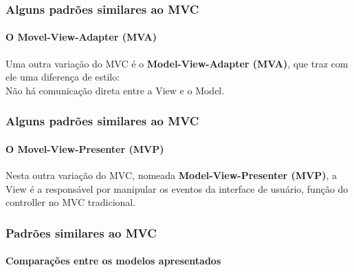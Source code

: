 \documentclass{beamer}
\begin{document}
\begin{frame}
\frametitle{Alguns padrões similares ao MVC}
\framesubtitle{O Movel-View-Adapter (MVA)}
	Uma outra variação do MVC é o \textbf{Model-View-Adapter (MVA)}, que traz com ele uma diferença de estilo:\\
	Não há comunicação direta entre a View e o Model.
\end{frame}

\begin{frame}
\frametitle{Alguns padrões similares ao MVC}
\framesubtitle{O Movel-View-Presenter (MVP)}
	Nesta outra variação do MVC, nomeada \textbf{Model-View-Presenter (MVP)}, a View é a responsável por manipular os eventos da interface de usuário, função do controller no MVC tradicional.
\end{frame}

\begin{frame}
\frametitle{Padrões similares ao MVC}
\framesubtitle{Comparações entre os modelos apresentados}
\end{frame}
\end{document}
